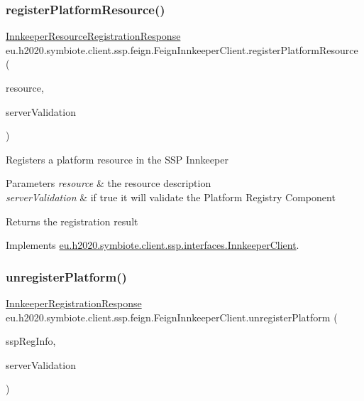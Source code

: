 \subsubsection{\texorpdfstring{register\+Platform\+Resource()}{registerPlatformResource()}}
{\footnotesize\ttfamily \hyperlink{classeu_1_1h2020_1_1symbiote_1_1ssp_1_1model_1_1InnkeeperResourceRegistrationResponse}{Innkeeper\+Resource\+Registration\+Response} eu.\+h2020.\+symbiote.\+client.\+ssp.\+feign.\+Feign\+Innkeeper\+Client.\+register\+Platform\+Resource (\begin{DoxyParamCaption}\item[{\hyperlink{classeu_1_1h2020_1_1symbiote_1_1cloud_1_1model_1_1ssp_1_1SspResource}{Ssp\+Resource}}]{resource,  }\item[{boolean}]{server\+Validation }\end{DoxyParamCaption})}

Registers a platform resource in the S\+SP Innkeeper 
\begin{DoxyParams}{Parameters}
{\em resource} & the resource description \\
\hline
{\em server\+Validation} & if true it will validate the Platform Registry Component \\
\hline
\end{DoxyParams}
\begin{DoxyReturn}{Returns}
the registration result 
\end{DoxyReturn}


Implements \hyperlink{interfaceeu_1_1h2020_1_1symbiote_1_1client_1_1ssp_1_1interfaces_1_1InnkeeperClient_aaa37ea24e8ab9dcb7daa1ab2a7ec0757}{eu.\+h2020.\+symbiote.\+client.\+ssp.\+interfaces.\+Innkeeper\+Client}.

\mbox{\label{classeu_1_1h2020_1_1symbiote_1_1client_1_1ssp_1_1feign_1_1FeignInnkeeperClient_a33938dd37e6685401225996fc783ea15}} 
\subsubsection{\texorpdfstring{unregister\+Platform()}{unregisterPlatform()}}
{\footnotesize\ttfamily \hyperlink{classeu_1_1h2020_1_1symbiote_1_1ssp_1_1model_1_1InnkeeperRegistrationResponse}{Innkeeper\+Registration\+Response} eu.\+h2020.\+symbiote.\+client.\+ssp.\+feign.\+Feign\+Innkeeper\+Client.\+unregister\+Platform (\begin{DoxyParamCaption}\item[{\hyperlink{classeu_1_1h2020_1_1symbiote_1_1cloud_1_1model_1_1ssp_1_1SspRegInfo}{Ssp\+Reg\+Info}}]{ssp\+Reg\+Info,  }\item[{boolean}]{server\+Validation }\end{DoxyParamCaption})}

